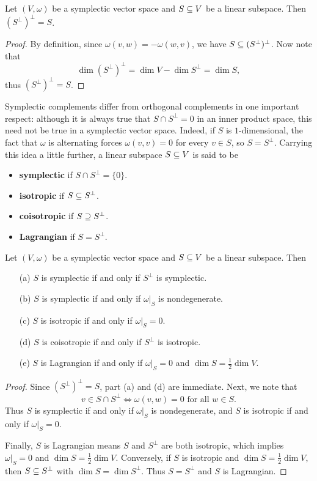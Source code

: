 \begin{proposition}
Let $(V,\omega)$ be a symplectic vector space and $S\subseteq V$ be a linear subspace. Then $(S^\bot)^\bot=S$.
\end{proposition}
\begin{proof}
By definition, since $\omega(v,w)=-\omega(w,v)$, we have $S\subseteq(S^\bot)^\bot$. Now note that
\[\dim(S^\bot)^\bot=\dim V-\dim S^\bot=\dim S,\]
thus $(S^\bot)^\bot=S$.
\end{proof}

Symplectic complements differ from orthogonal complements in one important respect: although it is always true that $S\cap S^\bot=0$ in an inner product space, this need not be true in a symplectic vector space. Indeed, if $S$ is $1$-dimensional, the fact that $\omega$ is alternating forces $\omega(v,v)=0$ for every $v\in S$, so $S=S^\bot$. Carrying this idea a little further, a linear subspace $S\subseteq V$ is said to be
\begin{itemize}
\item \textbf{symplectic} if $S\cap S^\bot=\{0\}$.
\item \textbf{isotropic} if $S\subseteq S^\bot$.
\item \textbf{coisotropic} if $S\supseteq S^\bot$.
\item \textbf{Lagrangian} if $S=S^\bot$.
\end{itemize}

\begin{proposition}\label{symplectic subspace iff}
Let $(V,\omega)$ be a symplectic vector space and $S\subseteq V$ be a linear subspace. Then
\begin{enumerate}
\item[(a)] $S$ is symplectic if and only if $S^\bot$ is symplectic.
\item[(b)] $S$ is symplectic if and only if $\omega|_S$ is nondegenerate.
\item[(c)] $S$ is isotropic if and only if $\omega|_S=0$.
\item[(d)] $S$ is coisotropic if and only if $S^\bot$ is isotropic.
\item[(e)] $S$ is Lagrangian if and only if $\omega|_S=0$ and $\dim S=\frac{1}{2}\dim V$.
\end{enumerate}
\end{proposition}
\begin{proof}
Since $(S^\bot)^\bot=S$, part (a) and (d) are immediate. Next, we note that
\[\text{$v\in S\cap S^\bot$}\iff\text{$\omega(v,w)=0$ for all $w\in S$}.\]
Thus $S$ is symplectic if and only if $\omega|_S$ is nondegenerate, and $S$ is isotropic if and only if $\omega|_S=0$.\par
Finally, $S$ is Lagrangian means $S$ and $S^\bot$ are both isotropic, which implies $\omega|_S=0$ and $\dim S=\frac{1}{2}\dim V$. Conversely, if $S$ is isotropic and $\dim S=\frac{1}{2}\dim V$, then
$S\subseteq S^\bot$ with $\dim S=\dim S^\bot$. Thus $S=S^\bot$ and $S$ is Lagrangian. 
\end{proof}

